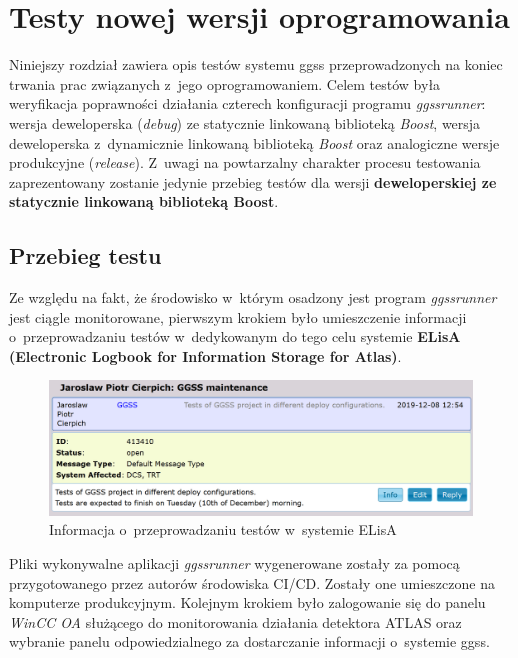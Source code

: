 \chapter{Testy nowej wersji oprogramowania}
\label{cha:test}
Niniejszy rozdział zawiera opis testów systemu \gls*{ggss} przeprowadzonych na koniec trwania prac związanych z~jego oprogramowaniem. Celem testów była weryfikacja poprawności działania czterech konfiguracji programu \textit{ggssrunner}: wersja deweloperska (\textit{debug}) ze statycznie linkowaną biblioteką \textit{Boost}, wersja deweloperska z~dynamicznie linkowaną biblioteką \textit{Boost} oraz analogiczne wersje produkcyjne (\textit{release}). Z~uwagi na powtarzalny charakter procesu testowania zaprezentowany zostanie jedynie przebieg testów dla wersji \textbf{deweloperskiej ze statycznie linkowaną biblioteką Boost}. 

\section{Przebieg testu}
Ze względu na fakt, że środowisko w~którym osadzony jest program \textit{ggssrunner} jest ciągle monitorowane, pierwszym krokiem było umieszczenie informacji o~przeprowadzaniu testów w~dedykowanym do tego celu systemie \textbf{ELisA (Electronic Logbook for Information Storage for Atlas)}.

\begin{figure}[H]
\centering
\caption{Informacja o~przeprowadzaniu testów w~systemie ELisA}
\label{fig:elisa}
\includegraphics[width=\textwidth]{res/png/elisa}
\end{figure}

Pliki wykonywalne aplikacji \textit{ggssrunner} wygenerowane zostały za pomocą przygotowanego przez autorów środowiska CI/CD. Zostały one umieszczone na komputerze produkcyjnym. Kolejnym krokiem było zalogowanie się do panelu \textit{WinCC OA} służącego do monitorowania działania detektora ATLAS oraz wybranie panelu odpowiedzialnego za dostarczanie informacji o~systemie \gls*{ggss}. 

